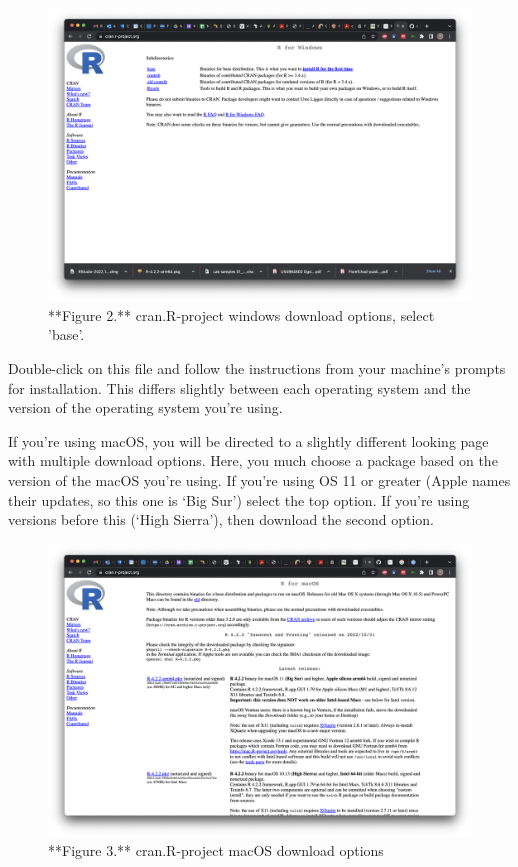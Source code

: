 \documentclass[
]{article}
\begin{document}
\begin{figure}

{\centering \includegraphics{images/cran_download} 

}

\caption{**Figure 2.** cran.R-project windows download options, select 'base'.}\label{fig:screenshot of download options}
\end{figure}

Double-click on this file and follow the instructions from your
machine's prompts for installation. This differs slightly between each
operating system and the version of the operating system you're using.

If you're using macOS, you will be directed to a slightly different
looking page with multiple download options. Here, you much choose a
package based on the version of the macOS you're using. If you're using
OS 11 or greater (Apple names their updates, so this one is `Big Sur')
select the top option. If you're using versions before this (`High
Sierra'), then download the second option.

\begin{figure}

{\centering \includegraphics{images/cran_macDL} 

}

\caption{**Figure 3.** cran.R-project macOS download options}\label{fig:screenshot of macOS DL options}
\end{figure}
\end{document}
